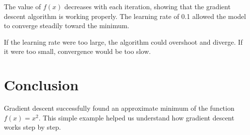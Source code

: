 \documentclass{article}
\begin{document}
The value of \( f(x) \) decreases with each iteration, showing that the gradient descent algorithm is working properly. The learning rate of 0.1 allowed the model to converge steadily toward the minimum.

If the learning rate were too large, the algorithm could overshoot and diverge. If it were too small, convergence would be too slow.

\section*{Conclusion}

Gradient descent successfully found an approximate minimum of the function \( f(x) = x^2 \). This simple example helped us understand how gradient descent works step by step.
\end{document}
